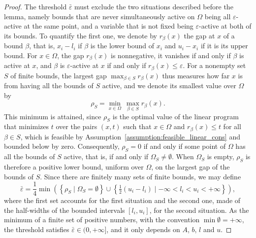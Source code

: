 \documentclass[pdflatex,sn-mathphys-num]{sn-jnl}%
\theoremstyle{thmstyleone}%
\begin{document}
\begin{proof}
	The threshold $\bar\varepsilon$ must exclude the two situations described before the lemma, namely bounds that are never simultaneously active on $\Omega$ being all $\varepsilon$-active at the same point, and a variable that is not fixed being $\varepsilon$-active at both of its bounds. To quantify the first one, we denote by $r_\beta(x)$ the gap at $x$ of a bound $\beta$, that is, $x_i - l_i$ if $\beta$ is the lower bound of $x_i$ and $u_i - x_i$ if it is its upper bound. For $x \in \Omega$, the gap $r_\beta(x)$ is nonnegative, it vanishes if and only if $\beta$ is active at $x$, and $\beta$ is $\varepsilon$-active at $x$ if and only if $r_\beta(x) \le \varepsilon$. For a nonempty set $S$ of finite bounds, the largest gap $\max_{\beta\in S} r_\beta(x)$ thus measures how far $x$ is from having all the bounds of $S$ active, and we denote its smallest value over $\Omega$ by
	\[\rho_S = \min_{x\in\Omega}\ \max_{\beta\in S} r_\beta(x).\]
	This minimum is attained, since $\rho_S$ is the optimal value of the linear program that minimizes $t$ over the pairs $(x,t)$ such that $x \in \Omega$ and $r_\beta(x) \le t$ for all $\beta \in S$, which is feasible by Assumption~\ref{assumption:feasible_linear_cons} and bounded below by zero. Consequently, $\rho_S = 0$ if and only if some point of $\Omega$ has all the bounds of $S$ active, that is, if and only if $\Omega_S \ne \emptyset$. When $\Omega_S$ is empty, $\rho_S$ is therefore a positive lower bound, uniform over $\Omega$, on the largest gap of the bounds of $S$. Since there are finitely many sets of finite bounds, we may define
	\[\bar\varepsilon = \frac{1}{4}\min\left(\left\{\rho_S \mid \Omega_S = \emptyset\right\} \cup \left\{\tfrac{1}{2}(u_i-l_i) \mid -\infty < l_i < u_i < +\infty\right\}\right),\]
	where the first set accounts for the first situation and the second one, made of the half-widths of the bounded intervals $[l_i,u_i]$, for the second situation. As the minimum of a finite set of positive numbers, with the convention $\min\emptyset = +\infty$, the threshold satisfies $\bar\varepsilon \in (0,+\infty]$, and it only depends on $A$, $b$, $l$ and $u$.


\end{proof}
\end{document}
